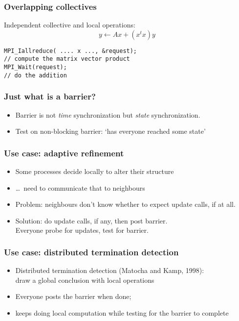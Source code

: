 
\begin{frame}[containsverbatim]\frametitle{Overlapping collectives}
  Independent collective and local operations:
\[ y \leftarrow Ax + (x^tx)y \]
\begin{lstlisting}
MPI_Iallreduce( .... x ..., &request);
// compute the matrix vector product
MPI_Wait(request);
// do the addition
\end{lstlisting}
\end{frame}

\begin{exerciseframe}[procgridnonblock]
  
\end{exerciseframe}


\begin{frame}[containsverbatim]\frametitle{Just what is a barrier?}
  \begin{itemize}
  \item Barrier is not \emph{time} synchronization but \emph{state}
    synchronization.
  \item Test on non-blocking barrier: `has everyone reached some
    state'
  \end{itemize}
\end{frame}

\begin{frame}[containsverbatim]\frametitle{Use case: adaptive refinement}
  \begin{itemize}
  \item Some processes decide locally to alter their structure
  \item \ldots~need to communicate that to neighbours
  \item Problem: neighbours don't know whether to expect update calls,
    if at all.
  \item Solution: do update calls, if any, then post barrier.\\
    Everyone probe for updates, test for barrier.    
  \end{itemize}
\end{frame}

\begin{frame}\frametitle{Use case: distributed termination detection}
  \begin{itemize}
  \item Distributed termination detection (Matocha and Kamp, 1998):\\
    draw a global conclusion with local operations
  \item Everyone posts the barrier when done;
  \item keeps doing local computation while testing for the barrier to
    complete
  \end{itemize}
\end{frame}

